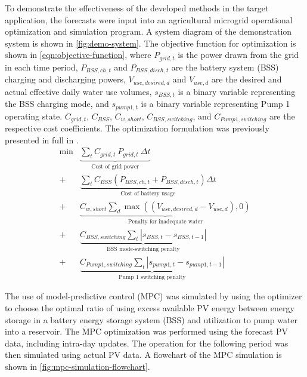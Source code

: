 To demonstrate the effectiveness of the developed methods in the target application,
the forecasts were input into an agricultural microgrid operational optimization and simulation program.
A system diagram of the demonstration system is shown in \cref{fig:demo-system}.
The objective function for optimization is shown in \cref{eqn:objective-function}, where
$P_{grid,t}$ is the power drawn from the grid in each time period,
$P_{BSS,ch,t}$ and $P_{BSS,disch,t}$ are the battery system (BSS) charging and discharging powers,
$V_{use,desired,d}$ and $V_{use,d}$ are the desired and actual effective daily water use volumes,
$s_{BSS,t}$ is a binary variable representing the BSS charging mode, and
$s_{pump1,t}$ is a binary variable representing Pump 1 operating state.
$C_{grid,t}$, $C_{BSS}$, $C_{w,short}$, $C_{BSS,switching}$, and $C_{Pump1,switching}$ are the respective cost coefficients.
The optimization formulation was previously presented in full in \cite{Brown2022}.
%
\begin{equation}
	\label{eqn:objective-function}
	\begin{split}
		\min &\underbrace{\sum_t C_{grid,t} \ P_{grid,t} \ \Delta t}_{\textrm{Cost of grid power}}
		\\
		{+} \: &\underbrace{\sum_t C_{BSS} \left( P_{BSS,ch,t} + P_{BSS,disch,t} \right) \Delta t}_{\textrm{Cost of battery usage}}
		\\
		{+} \: &\underbrace{C_{w,short} \sum_d \max\left(\left(V_{use,desired,d} - V_{use,d}\right), 0\right)}_{\textrm{Penalty for inadequate water}}
		\\
		{+} \: &\underbrace{C_{BSS,switching} \sum_t \left| s_{BSS,t} - s_{BSS,t-1} \right|}_{\textrm{BSS mode-switching penalty}}
		\\
		{+} \: &\underbrace{C_{Pump1,switching} \sum_t \left| s_{pump1,t} - s_{pump1,t-1} \right|}_{\textrm{Pump 1 switching penalty}}
	\end{split}
\end{equation}


The use of model-predictive control (MPC) was simulated by using the optimizer to choose the optimal ratio of using excess available PV energy between energy storage in a battery energy storage system (BSS) and utilization to pump water into a reservoir.
The MPC optimization was performed using the forecast PV data, including intra-day updates.
The operation for the following period was then simulated using actual PV data.
A flowchart of the MPC simulation is shown in \cref{fig:mpc-simulation-flowchart}.

